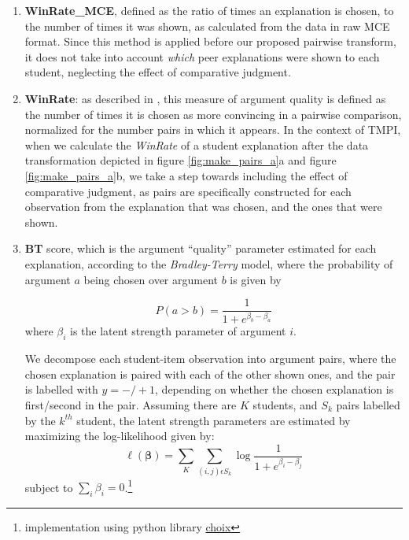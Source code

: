 \documentclass[notitlepage,12pt]{jedm}
\begin{document}
\begin{enumerate}
	
	\item \textbf{WinRate\_MCE}, defined as the ratio of times an explanation 
	is chosen, to the number of times it was shown, as calculated from the data 
	in raw MCE format.
	Since this method is applied before our proposed pairwise transform, it 
	does not take into account \textit{which} peer explanations were shown to 
	each student, neglecting the effect of comparative judgment.
	
	\item \textbf{WinRate}: as described in , this 
	measure of argument quality is defined as the number of times it is chosen 
	as more convincing in a pairwise comparison, normalized for the number 
	pairs in which it appears. 
	In the context of TMPI, when we calculate the \textit{WinRate} of a student 
	explanation after the data transformation depicted in figure 
	\ref{fig:make_pairs_a}a and figure \ref{fig:make_pairs_a}b, we take a step 
	towards including the effect of comparative judgment, as pairs are 
	specifically constructed for each observation from the explanation that was 
	chosen, and the ones that were shown.
	
	\item \textbf{BT} score, which is the argument ``quality'' parameter 
	estimated for each explanation, according to the \textit{Bradley-Terry} 
	model, where the probability of argument $a$ being chosen over argument $b$ 
	is given by 
	
	$$
	P(a>b) = 
	\frac{1}{1+e^{\beta_b-\beta_a}}
	$$
	where $\beta_i$ is the latent strength parameter of argument $i$.
	
	We decompose each student-item observation into argument pairs, where the 
	chosen explanation is paired with each of the other shown ones, and the 
	pair is labelled with $y=-/+1$, depending on whether the chosen explanation 
	is first/second in the pair.
	Assuming there are $K$ students, and $S_k$ pairs labelled by the $k^{th}$ 
	student, the latent strength parameters are estimated by maximizing 
	the log-likelihood given by:
	$$
	\ell(\boldsymbol{\beta})=\sum_{K}\sum_{(i,j)\epsilon S_k}^{} 
	\log\frac{1}{1+e^{\beta_i - \beta_j}}
	$$
	subject to $\sum_{i}\beta_i=0$.\footnote{implementation using python 
	library 
	\href{http://choix.lum.li/en/latest/}{choix}}
	

\end{enumerate}
\end{document}
